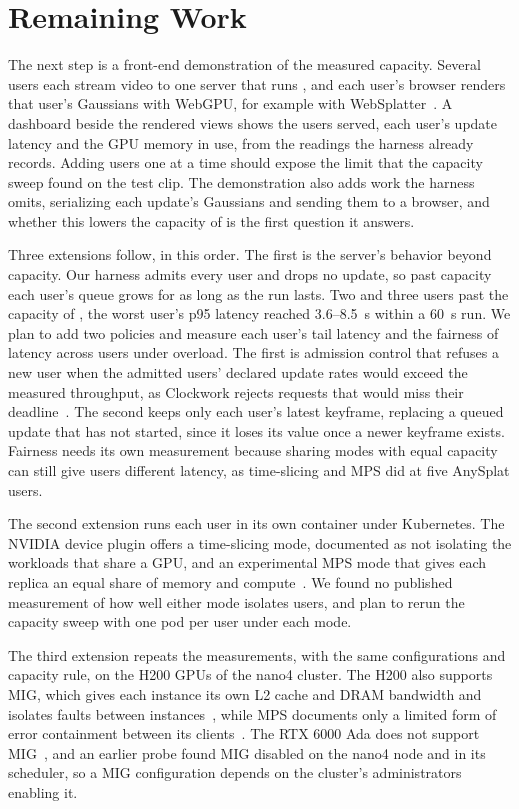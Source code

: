 \section{Remaining Work}
\label{sec:remaining}

The next step is a front-end demonstration of the measured capacity.
Several users each stream video to one server that runs \optd{}, and each user's browser renders that user's Gaussians with WebGPU, for example with WebSplatter~\cite{websplatter2026}.
A dashboard beside the rendered views shows the users served, each user's update latency and the GPU memory in use, from the readings the harness already records.
Adding users one at a time should expose the limit that the capacity sweep found on the test clip.
The demonstration also adds work the harness omits, serializing each update's Gaussians and sending them to a browser, and whether this lowers the capacity of \optd{} is the first question it answers.

Three extensions follow, in this order.
The first is the server's behavior beyond capacity.
Our harness admits every user and drops no update, so past capacity each user's queue grows for as long as the run lasts. %
Two and three users past the capacity of \optd{}, the worst user's p95 latency reached 3.6--8.5~s within a 60~s run. %
We plan to add two policies and measure each user's tail latency and the fairness of latency across users under overload.
The first is admission control that refuses a new user when the admitted users' declared update rates would exceed the measured throughput, as Clockwork rejects requests that would miss their deadline~\cite{clockwork2020}.
The second keeps only each user's latest keyframe, replacing a queued update that has not started, since it loses its value once a newer keyframe exists.
Fairness needs its own measurement because sharing modes with equal capacity can still give users different latency, as time-slicing and MPS did at five AnySplat users.

The second extension runs each user in its own container under Kubernetes.
The NVIDIA device plugin offers a time-slicing mode, documented as not isolating the workloads that share a GPU, and an experimental MPS mode that gives each replica an equal share of memory and compute~\cite{k8s_device_plugin}.
We found no published measurement of how well either mode isolates users, and plan to rerun the capacity sweep with one pod per user under each mode.

The third extension repeats the measurements, with the same configurations and capacity rule, on the H200 GPUs of the nano4 cluster.
The H200 also supports MIG, which gives each instance its own L2 cache and DRAM bandwidth and isolates faults between instances~\cite{nvidia_mig}, while MPS documents only a limited form of error containment between its clients~\cite{nvidia_mps}.
The RTX 6000 Ada does not support MIG~\cite{nvidia_mig}, and an earlier probe found MIG disabled on the nano4 node and in its scheduler, so a MIG configuration depends on the cluster's administrators enabling it. %

